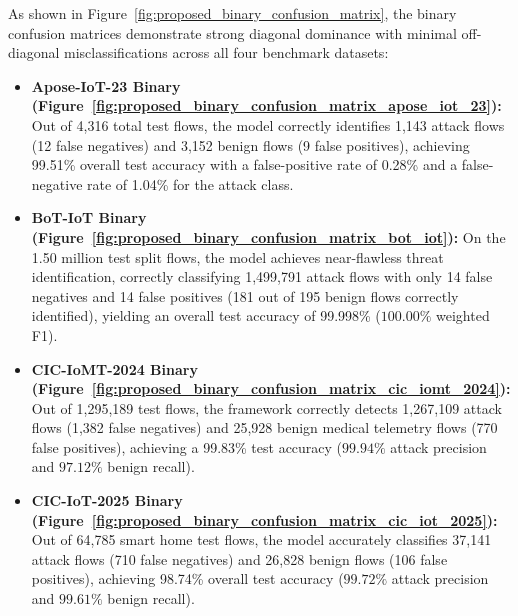 \documentclass[a4paper,fleqn]{cas-sc}
\begin{document}
As shown in Figure~\ref{fig:proposed_binary_confusion_matrix}, the binary confusion matrices demonstrate strong diagonal dominance with minimal off-diagonal misclassifications across all four benchmark datasets:
\begin{itemize}
    \item \textbf{Apose-IoT-23 Binary (Figure~\ref{fig:proposed_binary_confusion_matrix_apose_iot_23}):} Out of 4,316 total test flows, the model correctly identifies 1,143 attack flows (12 false negatives) and 3,152 benign flows (9 false positives), achieving 99.51\% overall test accuracy with a false-positive rate of 0.28\% and a false-negative rate of 1.04\% for the attack class.
    \item \textbf{BoT-IoT Binary (Figure~\ref{fig:proposed_binary_confusion_matrix_bot_iot}):} On the 1.50 million test split flows, the model achieves near-flawless threat identification, correctly classifying 1,499,791 attack flows with only 14 false negatives and 14 false positives (181 out of 195 benign flows correctly identified), yielding an overall test accuracy of 99.998\% ($100.00\%$ weighted F1).
    \item \textbf{CIC-IoMT-2024 Binary (Figure~\ref{fig:proposed_binary_confusion_matrix_cic_iomt_2024}):} Out of 1,295,189 test flows, the framework correctly detects 1,267,109 attack flows (1,382 false negatives) and 25,928 benign medical telemetry flows (770 false positives), achieving a 99.83\% test accuracy ($99.94\%$ attack precision and $97.12\%$ benign recall).
    \item \textbf{CIC-IoT-2025 Binary (Figure~\ref{fig:proposed_binary_confusion_matrix_cic_iot_2025}):} Out of 64,785 smart home test flows, the model accurately classifies 37,141 attack flows (710 false negatives) and 26,828 benign flows (106 false positives), achieving 98.74\% overall test accuracy ($99.72\%$ attack precision and $99.61\%$ benign recall).
\end{itemize}
\end{document}
